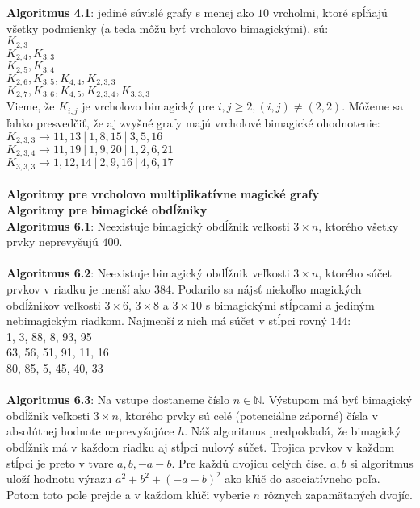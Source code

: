 \documentclass[12pt]{article}
\begin{document}
\textbf{Algoritmus 4.1}: jediné súvislé grafy s menej ako $10$ vrcholmi, ktoré spĺňajú všetky podmienky (a teda môžu byť vrcholovo bimagickými), sú: \\
$K_{2,3}$ \\
$K_{2,4}, K_{3,3}$ \\
$K_{2,5}, K_{3,4}$ \\
$K_{2,6}, K_{3,5}, K_{4,4}, K_{2,3,3}$ \\
$K_{2,7}, K_{3,6}, K_{4,5}, K_{2,3,4}, K_{3,3,3}$ \\

Vieme, že $K_{i,j}$ je vrcholovo bimagický pre $i,j \geq 2, (i,j) \neq (2,2)$. Môžeme sa ľahko presvedčiť, že aj zvyšné grafy majú vrcholové bimagické ohodnotenie: \\
$K_{2,3,3} \rightarrow 11, 13 ~|~ 1, 8, 15 ~|~ 3, 5, 16$ \\
$K_{2,3,4} \rightarrow 11, 19 ~|~ 1, 9, 20 ~|~ 1, 2, 6, 21$ \\
$K_{3,3,3} \rightarrow 1, 12, 14 ~|~ 2, 9, 16 ~|~ 4, 6, 17$ \\\\

\textbf{Algoritmy pre vrcholovo multiplikatívne magické grafy} \\

\textbf{Algoritmy pre bimagické obdĺžniky} \\

\textbf{Algoritmus 6.1}: Neexistuje bimagický obdĺžnik veľkosti $3 \times n$, ktorého všetky prvky neprevyšujú $400$. \\\\

\textbf{Algoritmus 6.2}: Neexistuje bimagický obdĺžnik veľkosti $3 \times n$, ktorého súčet prvkov v riadku je menší ako $384$. Podarilo sa nájsť niekoľko magických obdĺžnikov veľkosti $3 \times 6$, $3 \times 8$ a $3 \times 10$ s bimagickými stĺpcami a jediným nebimagickým riadkom. Najmenší z nich má súčet v stĺpci rovný $144$: \\
1, 3, 88, 8, 93, 95 \\
63, 56, 51, 91, 11, 16 \\
80, 85, 5, 45, 40, 33 \\\\

\textbf{Algoritmus 6.3}: Na vstupe dostaneme číslo $n \in \mathbb{N}$. Výstupom má byť bimagický obdĺžnik veľkosti $3 \times n$, ktorého prvky sú celé (potenciálne záporné) čísla v absolútnej hodnote neprevyšujúce $h$. Náš algoritmus predpokladá, že bimagický obdĺžnik má v každom riadku aj stĺpci nulový súčet. Trojica prvkov v každom stĺpci je preto v tvare $a, b, -a-b$. Pre každú dvojicu celých čísel $a,b$ si algoritmus uloží hodnotu výrazu $a^2 + b^2 + (-a-b)^2$ ako kľúč do asociatívneho poľa. Potom toto pole prejde a v každom kľúči vyberie $n$ rôznych zapamätaných dvojíc. \\
\end{document}
